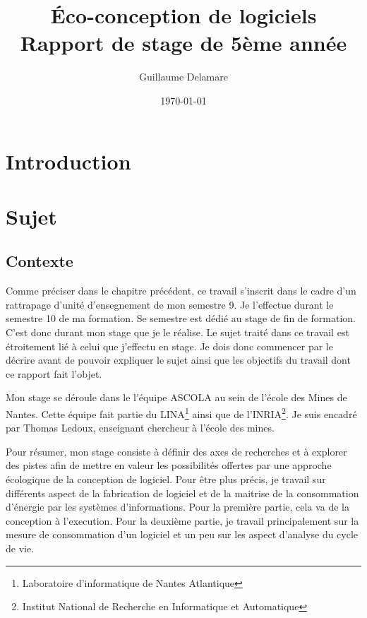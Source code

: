 \documentclass[a4paper, 11pt]{report}
\title{Éco-conception de logiciels\\ \large Rapport de stage de 5ème année}
\author{Guillaume Delamare}
\date{\today}
\begin{document}
\renewcommand{\labelitemi}{$\bullet$}
\renewcommand{\labelitemii}{$\diamond$}
\renewcommand{\labelitemiii}{$\ast$}
\renewcommand{\labelitemiv}{$\cdot$}

\maketitle
\newpage

\tableofcontents

\chapter{Introduction}

\chapter{Sujet}
	\section{Contexte}
Comme préciser dans le chapitre précédent, ce travail s'inscrit dans le cadre d'un rattrapage d'unité d'ensegnement de mon semestre 9. Je l'effectue durant le semestre 10 de ma formation. Se semestre est dédié au stage de fin de formation. C'est donc durant mon stage que je le réalise. Le sujet traité dans ce travail est étroitement lié à celui que j'effectu en stage. Je dois donc commencer par le décrire avant de pouvoir expliquer le sujet ainsi que les objectifs du travail dont ce rapport fait l'objet.

Mon stage se déroule dans le l'équipe ASCOLA au sein de l'école des Mines de Nantes. Cette équipe fait partie du LINA\footnote{Laboratoire d'informatique de Nantes Atlantique} ainsi que de l'INRIA\footnote{Institut National de Recherche en Informatique et Automatique}. Je suis encadré par Thomas Ledoux, enseignant chercheur à l'école des mines.

Pour résumer, mon stage consiste à définir des axes de recherches et à explorer des pistes afin de mettre en valeur les possibilités offertes par une approche écologique de la conception de logiciel. Pour être plus précis, je travail sur différents aspect de la fabrication de logiciel et de la maitrise de la consommation d'énergie par les systèmes d'informations. Pour la première partie, cela va de la conception à l'execution. Pour la deuxième partie, je travail principalement sur la mesure de consommation d'un logiciel et un peu sur les aspect d'analyse du cycle de vie.
\end{document}
